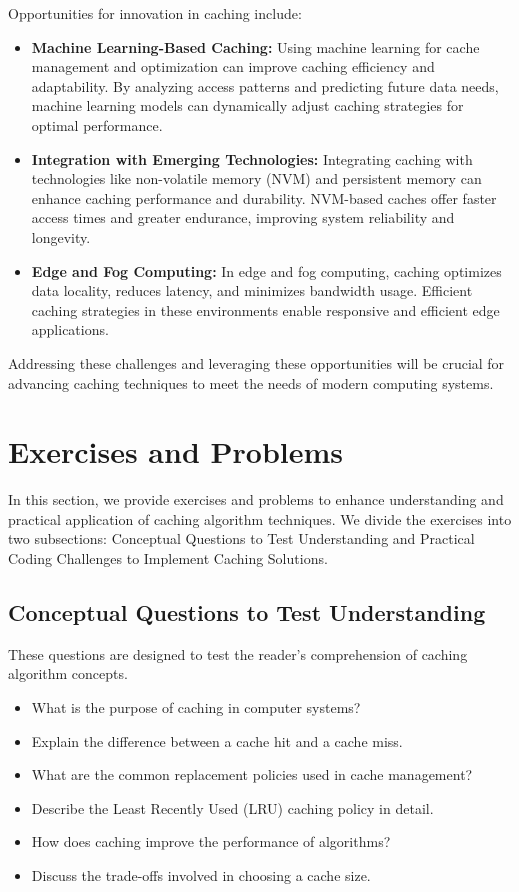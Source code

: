\documentclass[12pt]{book} %
\begin{document}
Opportunities for innovation in caching include:

\begin{itemize}
    \item \textbf{Machine Learning-Based Caching:} Using machine learning for cache management and optimization can improve caching efficiency and adaptability. By analyzing access patterns and predicting future data needs, machine learning models can dynamically adjust caching strategies for optimal performance.
    
    \item \textbf{Integration with Emerging Technologies:} Integrating caching with technologies like non-volatile memory (NVM) and persistent memory can enhance caching performance and durability. NVM-based caches offer faster access times and greater endurance, improving system reliability and longevity.
    
    \item \textbf{Edge and Fog Computing:} In edge and fog computing, caching optimizes data locality, reduces latency, and minimizes bandwidth usage. Efficient caching strategies in these environments enable responsive and efficient edge applications.
\end{itemize}

Addressing these challenges and leveraging these opportunities will be crucial for advancing caching techniques to meet the needs of modern computing systems.


\section{Exercises and Problems}
In this section, we provide exercises and problems to enhance understanding and practical application of caching algorithm techniques. We divide the exercises into two subsections: Conceptual Questions to Test Understanding and Practical Coding Challenges to Implement Caching Solutions.

\subsection{Conceptual Questions to Test Understanding}
These questions are designed to test the reader's comprehension of caching algorithm concepts.

\begin{itemize}
    \item What is the purpose of caching in computer systems?
    \item Explain the difference between a cache hit and a cache miss.
    \item What are the common replacement policies used in cache management?
    \item Describe the Least Recently Used (LRU) caching policy in detail.
    \item How does caching improve the performance of algorithms?
    \item Discuss the trade-offs involved in choosing a cache size.
\end{itemize}
\end{document}
